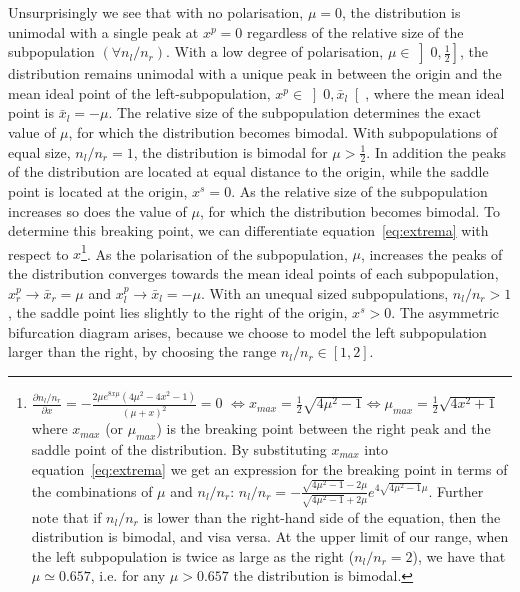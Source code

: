 \documentclass[preprint, 12pt]{elsarticle}
\begin{document}
Unsurprisingly we see that with no polarisation, $\mu = 0$, the distribution is unimodal with a single peak at $x^p=0$ regardless of the relative size of the subpopulation $\left(\forall n_l/n_r\right)$. With a low degree of polarisation, $\mu \in \left]0,\frac{1}{2}\right]$, the distribution remains unimodal with a unique peak in between the origin and the mean ideal point of the left-subpopulation, $x^p \in \left]0,{\bar x_l}\right[$, where the mean ideal point is ${\bar x_l} = -\mu$. The relative size of the subpopulation determines the exact value of $\mu$, for which the distribution becomes bimodal. With subpopulations of equal size, $n_l/n_r=1$, the distribution is bimodal for $\mu > \frac{1}{2}$. In addition the peaks of the distribution are located at equal distance to the origin, while the saddle point is located at the origin, $x^s = 0$. As the relative size of the subpopulation increases so does the value of $\mu$, for which the distribution becomes bimodal. To determine this breaking point, we can differentiate equation~\ref{eq:extrema} with respect to $x$\footnote{$\frac{\partial n_l/n_r}{{\partial x}} = - \frac{2 \mu e^{8x\mu} \left(4\mu^2-4x^2-1\right)}{(\mu+x)^2} = 0$ $\Leftrightarrow x_{max} = \frac{1}{2} \sqrt{4{\mu}^2-1} \Leftrightarrow \mu_{max} = \frac{1}{2} \sqrt{4x^2+1}$ where $x_{max}$ (or $\mu_{max}$) is the breaking point between the right peak and the saddle point of the distribution. By substituting $x_{max}$ into equation~\ref{eq:extrema} we get an expression for the breaking point in terms of the combinations of $\mu$ and $n_l/n_r$: $n_l/n_r = - \frac{\sqrt{4{\mu}^2-1} -2\mu}{\sqrt{4{\mu}^2-1} +2\mu} e^{4\sqrt{4{\mu}^2-1}\mu}$. Further note that if $n_l/n_r$ is lower than the right-hand side of the equation, then the distribution is bimodal, and visa versa. At the upper limit of our range, when the left subpopulation is twice as large as the right ($n_l/n_r=2$), we have that $\mu \simeq 0.657$, i.e. for any $\mu > 0.657$ the distribution is bimodal.}. As the polarisation of the subpopulation, $\mu$, increases the peaks of the distribution converges towards the mean ideal points of each subpopulation, $x^p_r \to {\bar x_r} = \mu$ and $x^p_l \to {\bar x_l} = -\mu$. With an unequal sized subpopulations, $n_l/n_r > 1$, the saddle point lies slightly to the right of the origin, $x^s > 0$. The asymmetric bifurcation diagram arises, because we choose to model the left subpopulation larger than the right, by choosing the range $n_l/n_r \in [1,2]$.
\end{document}
